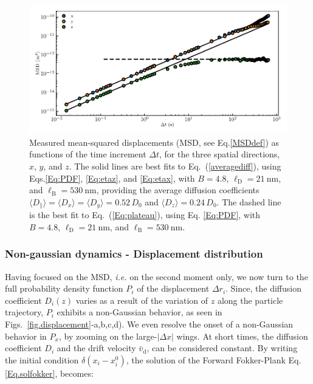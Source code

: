  \begin{figure}[t!]
	\centering
	\includegraphics{02_body/chapter3/images/trajctory_analysis/msd.pdf}
	\caption{Measured mean-squared displacements (MSD, see Eq.\ref{MSDdef}) as functions of the time increment $\Delta t$, for the three spatial directions, $x$, $y$, and $z$. The solid lines are best fits to Eq.~(\ref{averagediff}), using Eqs.\ref{Eq:PDF}, \ref{Eq:etaz}, and \ref{Eq:etax}, with $B = 4.8$, $\ell_\mathrm{D} = 21 ~ \mathrm{nm}$, and $\ell_\mathrm{B} = 530~\mathrm{nm}$,
		providing the average diffusion coefficients $\langle{D_\parallel}\rangle= \langle D_x\rangle=\langle D_y \rangle =0.52\,D_0$ and $\langle D_z \rangle =0.24\, D_0$. The dashed line is the best fit to Eq.~(\ref{Eq:plateau}), using Eq. \ref{Eq:PDF}, with $B = 4.8$, $\ell_\mathrm{D} = 21 ~ \mathrm{nm}$, and $\ell_\mathrm{B} = 530~\mathrm{nm}$.}
	\label{fig.MSD}
\end{figure}


\subsubsection{Non-gaussian dynamics - Displacement distribution}

Having focused on the \gls{MSD}, \textit{i.e.} on the second moment only, we now turn to the full probability density function $P_i$ of the displacement $\Delta r_i$. Since, the diffusion coefficient $D_i(z)$ varies as a result of the variation of $z$ along the particle trajectory, $P_i$ exhibits a non-Gaussian behavior, as seen in Figs.~\ref{fig.displacement}-a,b,c,d). We even resolve the onset of a non-Gaussian behavior in $P_x$, by zooming on the large-$\lvert\Delta x\rvert$ wings. At short times, the diffusion coefficient $D_i$ and the drift velocity $\bar{v}_\mathrm{d}$, can be considered constant. By writing the initial condition $\delta(x_i - x_i ^0)$, the solution of the Forward Fokker-Plank Eq.\ref{Eq.solfokker}, becomes:

